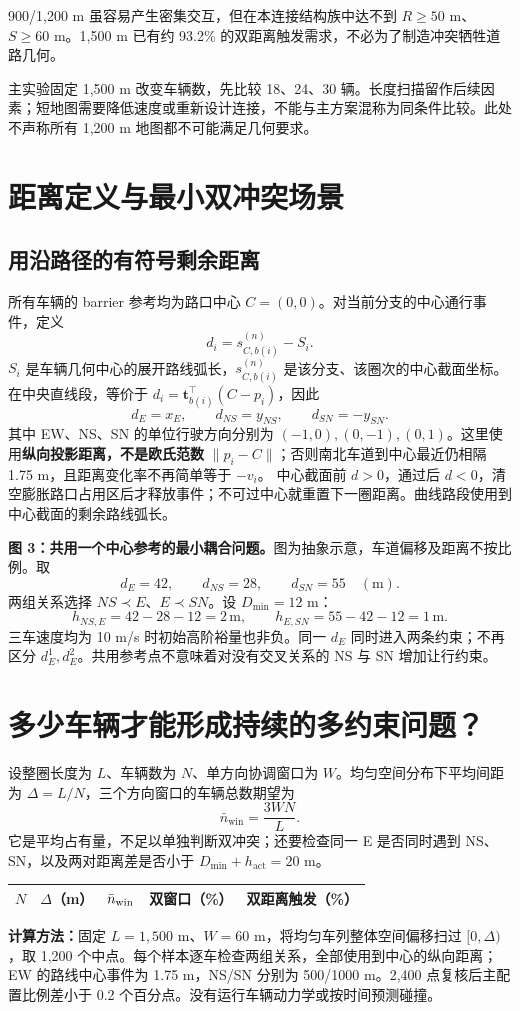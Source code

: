 \documentclass[UTF8,fontset=fandol,11pt,a4paper]{ctexart}
\newcommand{\unit}[1]{\,\mathrm{#1}}\newcommand{\nom}{\mathrm{nom}}
\newcommand{\page}[1]{\clearpage\section{#1}}
\begin{document}
900/1,200 m 虽容易产生密集交互，但在本连接结构族中达不到 $R\geq50$ m、$S\geq60$ m。1,500 m 已有约 93.2\% 的双距离触发需求，不必为了制造冲突牺牲道路几何。

主实验固定 1,500 m 改变车辆数，先比较 18、24、30 辆。长度扫描留作后续因素；短地图需要降低速度或重新设计连接，不能与主方案混称为同条件比较。此处不声称所有 1,200 m 地图都不可能满足几何要求。


\page{距离定义与最小双冲突场景}
\subsection{用沿路径的有符号剩余距离}
所有车辆的 barrier 参考均为路口中心 $C=(0,0)$。对当前分支的中心通行事件，定义
\[
d_i=s_{C,b(i)}^{(n)}-S_i.
\]
$S_i$ 是车辆几何中心的展开路线弧长，$s_{C,b(i)}^{(n)}$ 是该分支、该圈次的中心截面坐标。在中央直线段，等价于 $d_i=\mathbf t_{b(i)}^\top(C-p_i)$，因此
\[
d_E=x_E,\qquad d_{NS}=y_{NS},\qquad d_{SN}=-y_{SN}.
\]
其中 EW、NS、SN 的单位行驶方向分别为 $(-1,0),(0,-1),(0,1)$。这里使用\textbf{纵向投影距离，不是欧氏范数} $\|p_i-C\|$；否则南北车道到中心最近仍相隔 1.75 m，且距离变化率不再简单等于 $-v_i$。
中心截面前 $d>0$，通过后 $d<0$，清空膨胀路口占用区后才释放事件；不可过中心就重置下一圈距离。曲线路段使用到中心截面的剩余路线弧长。
\begin{center}\end{center}
\textbf{图 3：共用一个中心参考的最小耦合问题。}图为抽象示意，车道偏移及距离不按比例。取
\[
d_E=42,\qquad d_{NS}=28,\qquad d_{SN}=55\quad(\mathrm m).
\]
两组关系选择 $NS\prec E$、$E\prec SN$。设 $D_{\min}=12$ m：
\[
h_{NS,E}=42-28-12=2\unit{m},\qquad h_{E,SN}=55-42-12=1\unit{m}.
\]
三车速度均为 10 m/s 时初始高阶裕量也非负。同一 $d_E$ 同时进入两条约束；不再区分 $d_E^1,d_E^2$。共用参考点不意味着对没有交叉关系的 NS 与 SN 增加让行约束。


\page{多少车辆才能形成持续的多约束问题？}
设整圈长度为 $L$、车辆数为 $N$、单方向协调窗口为 $W$。均匀空间分布下平均间距为 $\Delta=L/N$，三个方向窗口的车辆总数期望为
\[
\bar n_{\mathrm{win}}=\frac{3WN}{L}.
\]
它是平均占有量，不足以单独判断双冲突；还要检查同一 E 是否同时遇到 NS、SN，以及两对距离差是否小于 $D_{\min}+h_{\mathrm{act}}=20$ m。
\begin{center}\small
\begin{tabular}{rrrrr}\toprule
$N$ & $\Delta$（m） & $\bar n_{\rm win}$ & 双窗口（\%） & 双距离触发（\%）\\\midrule

\end{tabular}\end{center}
\textbf{计算方法：}固定 $L=1,500$ m、$W=60$ m，将均匀车列整体空间偏移扫过 $[0,\Delta)$，取 1,200 个中点。每个样本逐车检查两组关系，全部使用到中心的纵向距离；EW 的路线中心事件为 1.75 m，NS/SN 分别为 500/1000 m。2,400 点复核后主配置比例差小于 0.2 个百分点。没有运行车辆动力学或按时间预测碰撞。
\end{document}
